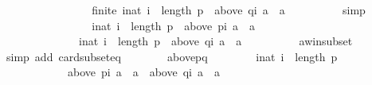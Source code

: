 \begin{isabellebody}
\ \ \ \ \ \ \isamarkupfalse%
\ \isamarkupfalse%
\isanewline
\ \ \ \ \ \ \ \ {\isachardoublequoteopen}finite\ {\isacharbraceleft}{\kern0pt}i{\isacharcolon}{\kern0pt}{\isacharcolon}{\kern0pt}nat{\isachardot}{\kern0pt}\ i\ {\isacharless}{\kern0pt}\ length\ p\ {\isasymand}\ above\ {\isacharparenleft}{\kern0pt}q{\isacharbang}{\kern0pt}i{\isacharparenright}{\kern0pt}\ a\ {\isacharequal}{\kern0pt}\ {\isacharbraceleft}{\kern0pt}a{\isacharbraceright}{\kern0pt}{\isacharbraceright}{\kern0pt}{\isachardoublequoteclose}\isanewline
\ \ \ \ \ \ \ \ \isamarkupfalse%
\ simp\isanewline
\ \ \ \ \ \ \isamarkupfalse%
\ \isamarkupfalse%
\isanewline
\ \ \ \ \ \ \ \ {\isachardoublequoteopen}{\isacharbraceleft}{\kern0pt}i{\isacharcolon}{\kern0pt}{\isacharcolon}{\kern0pt}nat{\isachardot}{\kern0pt}\ i\ {\isacharless}{\kern0pt}\ length\ p\ {\isasymand}\ above\ {\isacharparenleft}{\kern0pt}p{\isacharbang}{\kern0pt}i{\isacharparenright}{\kern0pt}\ a\ {\isacharequal}{\kern0pt}\ {\isacharbraceleft}{\kern0pt}a{\isacharbraceright}{\kern0pt}{\isacharbraceright}{\kern0pt}\ {\isacharequal}{\kern0pt}\isanewline
\ \ \ \ \ \ \ \ \ \ \ \ \ \ {\isacharbraceleft}{\kern0pt}i{\isacharcolon}{\kern0pt}{\isacharcolon}{\kern0pt}nat{\isachardot}{\kern0pt}\ i\ {\isacharless}{\kern0pt}\ length\ p\ {\isasymand}\ above\ {\isacharparenleft}{\kern0pt}q{\isacharbang}{\kern0pt}i{\isacharparenright}{\kern0pt}\ a\ {\isacharequal}{\kern0pt}\ {\isacharbraceleft}{\kern0pt}a{\isacharbraceright}{\kern0pt}{\isacharbraceright}{\kern0pt}{\isachardoublequoteclose}\isanewline
\ \ \ \ \ \ \ \ \isamarkupfalse%
\ a{\isacharunderscore}{\kern0pt}win{\isacharunderscore}{\kern0pt}subset\isanewline
\ \ \ \ \ \ \ \ \isamarkupfalse%
\ {\isacharparenleft}{\kern0pt}simp\ add{\isacharcolon}{\kern0pt}\ card{\isacharunderscore}{\kern0pt}subset{\isacharunderscore}{\kern0pt}eq{\isacharparenright}{\kern0pt}\isanewline
\ \ \ \ \ \ \isamarkupfalse%
\ above{\isacharunderscore}{\kern0pt}pq{\isacharcolon}{\kern0pt}\isanewline
\ \ \ \ \ \ \ \ {\isachardoublequoteopen}{\isasymforall}i{\isacharcolon}{\kern0pt}{\isacharcolon}{\kern0pt}nat{\isachardot}{\kern0pt}\ i\ {\isacharless}{\kern0pt}\ length\ p\ {\isasymlongrightarrow}\isanewline
\ \ \ \ \ \ \ \ \ \ \ \ above\ {\isacharparenleft}{\kern0pt}p{\isacharbang}{\kern0pt}i{\isacharparenright}{\kern0pt}\ a\ {\isacharequal}{\kern0pt}\ {\isacharbraceleft}{\kern0pt}a{\isacharbraceright}{\kern0pt}\ {\isasymlongleftrightarrow}\ above\ {\isacharparenleft}{\kern0pt}q{\isacharbang}{\kern0pt}i{\isacharparenright}{\kern0pt}\ a\ {\isacharequal}{\kern0pt}\ {\isacharbraceleft}{\kern0pt}a{\isacharbraceright}{\kern0pt}{\isachardoublequoteclose}\isanewline

\end{isabellebody}
